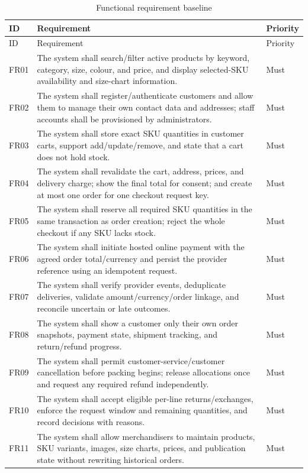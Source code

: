 \begin{longtable}{P{.1\linewidth}P{.68\linewidth}P{.12\linewidth}}
\caption{Functional requirement baseline}\label{tab:fr}\\
\toprule ID & Requirement & Priority \\\midrule\endfirsthead
\toprule ID & Requirement & Priority \\\midrule\endhead
FR01 & The system shall search/filter active products by keyword, category, size, colour, and price, and display selected-SKU availability and size-chart information. & Must\\
FR02 & The system shall register/authenticate customers and allow them to manage their own contact data and addresses; staff accounts shall be provisioned by administrators. & Must\\
FR03 & The system shall store exact SKU quantities in customer carts, support add/update/remove, and state that a cart does not hold stock. & Must\\
FR04 & The system shall revalidate the cart, address, prices, and delivery charge; show the final total for consent; and create at most one order for one checkout request key. & Must\\
FR05 & The system shall reserve all required SKU quantities in the same transaction as order creation; reject the whole checkout if any SKU lacks stock. & Must\\
FR06 & The system shall initiate hosted online payment with the agreed order total/currency and persist the provider reference using an idempotent request. & Must\\
FR07 & The system shall verify provider events, deduplicate deliveries, validate amount/currency/order linkage, and reconcile uncertain or late outcomes. & Must\\
FR08 & The system shall show a customer only their own order snapshots, payment state, shipment tracking, and return/refund progress. & Must\\
FR09 & The system shall permit customer-service/customer cancellation before packing begins; release allocations once and request any required refund independently. & Must\\
FR10 & The system shall accept eligible per-line returns/exchanges, enforce the request window and remaining quantities, and record decisions with reasons. & Must\\
FR11 & The system shall allow merchandisers to maintain products, SKU variants, images, size charts, prices, and publication state without rewriting historical orders. & Must\\

\end{longtable}
